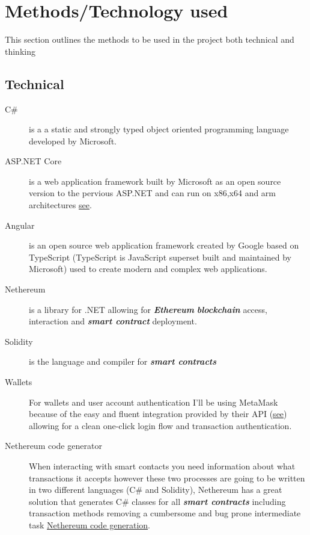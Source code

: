 \documentclass[12pt]{article}
\newcommand{\keyword}[1]{\textbf{\textit{#1}}}
\begin{document}
\section{Methods/Technology used}

This section outlines the methods to be used in the project both technical and thinking

\subsection{Technical}

\begin{description}
	\item[C\#] is a a static and strongly typed object oriented programming language developed by Microsoft.
	\item[ASP.NET Core] is a web application framework built by Microsoft as an open source version to the pervious ASP.NET and can run on x86,x64 and arm architectures \href{https://docs.microsoft.com/en-us/aspnet/core/introduction-to-aspnet-core}{see}.
	\item[Angular] is an open source web application framework created by Google based on TypeScript (TypeScript is JavaScript superset built and maintained by Microsoft) used to create modern and complex web applications.
	\item[Nethereum] is a library for .NET allowing for \keyword{Ethereum} \keyword{blockchain} access, interaction and \keyword{smart contract} deployment.
	\item[Solidity] is the language and compiler for \keyword{smart contracts}
	\item[Wallets] For wallets and user account authentication I'll be using MetaMask because of the easy and fluent integration provided by their API (\href{https://docs.metamask.io/guide/rpc-api.html}{see}) allowing for a clean one-click login flow and transaction authentication.
	\item[Nethereum code generator] When interacting with smart contacts you need information about what transactions it accepts however these two processes are going to be written in two different languages (C\# and Solidity), Nethereum has a great solution that generates C\# classes for all \keyword{smart contracts} including transaction methods removing a cumbersome and bug prone intermediate task \href{https://docs.nethereum.com/en/latest/nethereum-code-generation/}{Nethereum code generation}.
\end{description}
\end{document}
